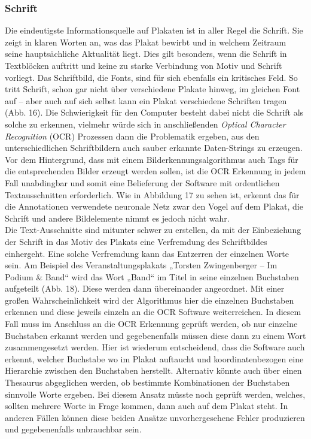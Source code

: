 \documentclass[a4paper,12pt,ngerman]{article}
\begin{document}
\subsubsection{Schrift}
Die eindeutigste Informationsquelle auf Plakaten ist in aller Regel die Schrift. Sie zeigt in klaren Worten an, was das Plakat bewirbt und in welchem Zeitraum seine hauptsächliche Aktualität liegt. Dies gilt besonders, wenn die Schrift in Textblöcken auftritt und keine zu starke Verbindung von Motiv und Schrift vorliegt. Das Schriftbild, die Fonts, sind für sich ebenfalls ein kritisches Feld. So tritt Schrift, schon gar nicht über verschiedene Plakate hinweg, im gleichen Font auf – aber auch auf sich selbst kann ein Plakat verschiedene Schriften tragen (Abb. 16). Die Schwierigkeit für den Computer besteht dabei nicht die Schrift als solche zu erkennen, vielmehr würde sich in anschließenden \textit{Optical Character Recognition} (OCR) Prozessen dann die Problematik ergeben, aus den unterschiedlichen Schriftbildern auch sauber erkannte Daten-Strings zu erzeugen. Vor dem Hintergrund, dass mit einem Bilderkennungsalgorithmus auch Tags für die entsprechenden Bilder erzeugt werden sollen, ist die OCR Erkennung in jedem Fall unabdingbar und somit eine Belieferung der Software mit ordentlichen Textausschnitten erforderlich. Wie in Abbildung 17 zu sehen ist, erkennt das für die Annotationen verwendete neuronale Netz zwar den Vogel auf dem Plakat, die Schrift und andere Bildelemente nimmt es jedoch nicht wahr. \\
Die Text-Ausschnitte sind mitunter schwer zu erstellen, da mit der Einbeziehung der Schrift in das Motiv des Plakats eine Verfremdung des Schriftbildes einhergeht. Eine solche Verfremdung kann das Entzerren der einzelnen Worte sein. Am Beispiel des Veranstaltungsplakats „Torsten Zwingenberger – Im Podium \& Band“ wird das Wort „Band“ im Titel in seine einzelnen Buchstaben aufgeteilt (Abb. 18). Diese werden dann übereinander angeordnet. Mit einer großen Wahrscheinlichkeit wird der Algorithmus hier die einzelnen Buchstaben erkennen und diese jeweils einzeln an die OCR Software weiterreichen. In diesem Fall muss im Anschluss an die OCR Erkennung geprüft werden, ob nur einzelne Buchstaben erkannt werden und gegebenenfalls müssen diese dann zu einem Wort zusammengesetzt werden. Hier ist wiederum entscheidend, dass die Software auch erkennt, welcher Buchstabe wo im Plakat auftaucht und koordinatenbezogen eine Hierarchie zwischen den Buchstaben herstellt. Alternativ könnte auch über einen Thesaurus abgeglichen werden, ob bestimmte Kombinationen der Buchstaben sinnvolle Worte ergeben. Bei diesem Ansatz müsste noch geprüft werden, welches, sollten mehrere Worte in Frage kommen, dann auch auf dem Plakat steht. In anderen Fällen können diese beiden Ansätze unvorhergesehene Fehler produzieren und gegebenenfalls unbrauchbar sein. \\
\end{document}
